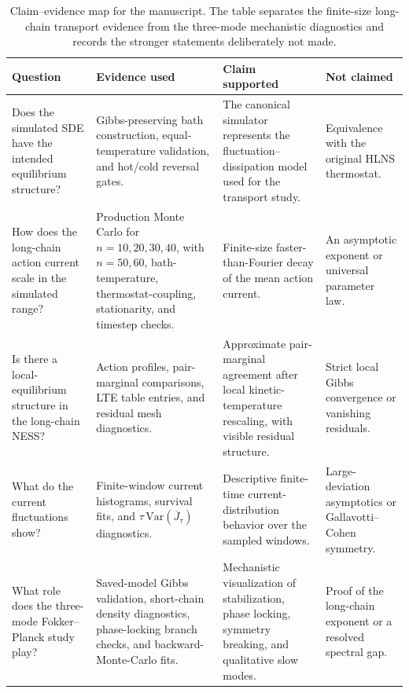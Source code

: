 \documentclass[11pt,a4paper]{article}
\theoremstyle{definition}
\numberwithin{equation}{section}   %
\begin{document}
\begin{table}[ht]\centering
\small
\setlength{\tabcolsep}{2pt}
\begin{tabular}{>{\raggedright\arraybackslash}p{}
                >{\raggedright\arraybackslash}p{}
                >{\raggedright\arraybackslash}p{}
                >{\raggedright\arraybackslash}p{}}
\toprule
Question & Evidence used & Claim supported & Not claimed \\
\midrule
Does the simulated SDE have the intended equilibrium structure? &
Gibbs-preserving bath construction, equal-temperature validation, and
hot/cold reversal gates. &
The canonical simulator represents the fluctuation--dissipation model used for
the transport study. &
Equivalence with the original HLNS thermostat. \\
\midrule
How does the long-chain action current scale in the simulated range? &
Production Monte Carlo for $n=10,20,30,40$, with $n=50,60$,
bath-temperature, thermostat-coupling, stationarity, and timestep checks. &
Finite-size faster-than-Fourier decay of the mean action current. &
An asymptotic exponent or universal parameter law. \\
\midrule
Is there a local-equilibrium structure in the long-chain NESS? &
Action profiles, pair-marginal comparisons, LTE table entries, and residual
mesh diagnostics. &
Approximate pair-marginal agreement after local kinetic-temperature rescaling,
with visible residual structure. &
Strict local Gibbs convergence or vanishing residuals. \\
\midrule
What do the current fluctuations show? &
Finite-window current histograms, survival fits, and
$\tau\,\mathrm{Var}(\overline J_\tau)$ diagnostics. &
Descriptive finite-time current-distribution behavior over the sampled
windows. &
Large-deviation asymptotics or Gallavotti--Cohen symmetry. \\
\midrule
What role does the three-mode Fokker--Planck study play? &
Saved-model Gibbs validation, short-chain density diagnostics,
phase-locking branch checks, and backward-Monte-Carlo fits. &
Mechanistic visualization of stabilization, phase locking, symmetry breaking,
and qualitative slow modes. &
Proof of the long-chain exponent or a resolved spectral gap. \\
\bottomrule
\end{tabular}
\caption{Claim--evidence map for the manuscript. The table separates the
finite-size long-chain transport evidence from the three-mode mechanistic
diagnostics and records the stronger statements deliberately not made.}
\label{tab:claim-evidence-map}
\end{table}
\end{document}
